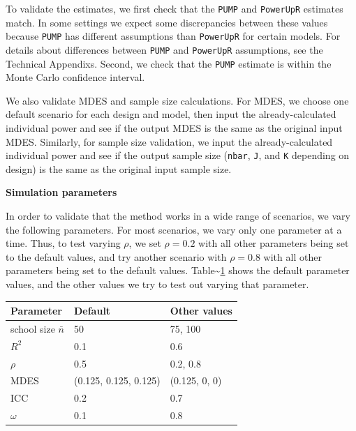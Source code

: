 \documentclass[
]{article}
\begin{document}
To validate the estimates, we first check that the \texttt{PUMP} and
\texttt{PowerUpR} estimates match. In some settings we expect some
discrepancies between these values because \texttt{PUMP} has different
assumptions than \texttt{PowerUpR} for certain models. For details about
differences between \texttt{PUMP} and \texttt{PowerUpR} assumptions, see
the Technical Appendixs. Second, we check that the \texttt{PUMP}
estimate is within the Monte Carlo confidence interval.

We also validate MDES and sample size calculations. For MDES, we choose
one default scenario for each design and model, then input the
already-calculated individual power and see if the output MDES is the
same as the original input MDES. Similarly, for sample size validation,
we input the already-calculated individual power and see if the output
sample size (\texttt{nbar}, \texttt{J}, and \texttt{K} depending on
design) is the same as the original input sample size.

\textbf{Simulation parameters}

In order to validate that the method works in a wide range of scenarios,
we vary the following parameters. For most scenarios, we vary only one
parameter at a time. Thus, to test varying \(\rho\), we set
\(\rho = 0.2\) with all other parameters being set to the default
values, and try another scenario with \(\rho = 0.8\) with all other
parameters being set to the default values.
Table\textasciitilde{}\ref{tab:val_params} shows the default parameter
values, and the other values we try to test out varying that parameter.

\begin{table}
\centering
\begin{tabular}{l l l}
Parameter               & Default                & Other values \\ \hline
school size $\bar{n}$   & 50                     & 75, 100           \\
$R^2$                   & 0.1                    & 0.6               \\
$\rho$                  & 0.5                    & 0.2, 0.8          \\
MDES                    & (0.125, 0.125, 0.125)  & (0.125, 0, 0)     \\
ICC                     & 0.2                    & 0.7               \\
$\omega$                & 0.1                    & 0.8               \\
\end{tabular}
\label{tab:val_params}
\end{table}
\end{document}
